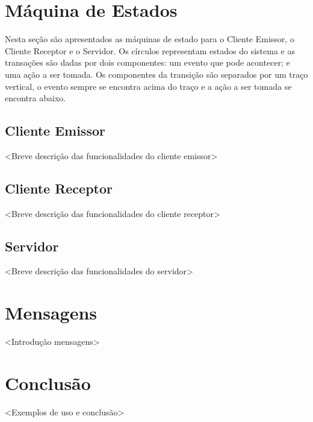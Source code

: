 \documentclass[12pt]{article}
\begin{document}
\section{Máquina de Estados}\label{sec:MaquinaDeEstados}

Nesta seção são apresentados as máquinas de estado para o
Cliente Emissor,
o Cliente Receptor e
o Servidor.
Os círculos representam estados do sistema e
as transações são dadas por dois componentes:
um evento que pode acontecer;
e uma ação a ser tomada.
Os componentes da transição são separados por um traço vertical,
o evento sempre se encontra acima do traço e
a ação a ser tomada se encontra abaixo.

\subsection{Cliente Emissor}\label{sec:Emissor}
<Breve descrição das funcionalidades do cliente emissor>
\subsection{Cliente Receptor}\label{sec:Receptor}
<Breve descrição das funcionalidades do cliente receptor>
\subsection{Servidor}\label{sec:Servidor}
<Breve descrição das funcionalidades do servidor>

\section{Mensagens}\label{sec:Mensagens}
<Introdução mensagens>

\section{Conclusão}\label{sec:Conclusao}
<Exemplos de uso e conclusão>
\end{document}
